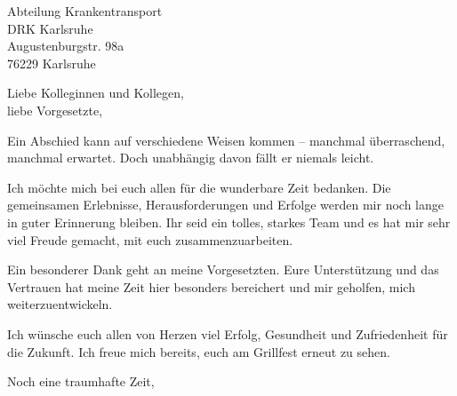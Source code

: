\documentclass[
    a4paper,
    version=last,
    ]{scrlttr2}
\begin{document}
\begin{letter}{%
	Abteilung Krankentransport \\
	DRK Karlsruhe \\
	Augustenburgstr. 98a \\
	76229 Karlsruhe \\
}



\opening{Liebe Kolleginnen und Kollegen,\\
		liebe Vorgesetzte,}

	Ein Abschied kann auf verschiedene Weisen kommen -- manchmal überraschend, manchmal erwartet. Doch unabhängig davon fällt er niemals leicht.

	Ich möchte mich bei euch allen für die wunderbare Zeit bedanken. Die gemeinsamen Erlebnisse, Herausforderungen und Erfolge werden mir noch lange in guter Erinnerung bleiben. 
	Ihr seid ein tolles, starkes Team und es hat mir sehr viel Freude gemacht, mit euch zusammenzuarbeiten.

	Ein besonderer Dank geht an meine Vorgesetzten. Eure Unterstützung und das Vertrauen hat meine Zeit hier besonders bereichert und mir geholfen, mich weiterzuentwickeln.

	Ich wünsche euch allen von Herzen viel Erfolg, Gesundheit und Zufriedenheit für die Zukunft. Ich freue mich bereits, euch am Grillfest erneut zu sehen.


\closing{Noch eine traumhafte Zeit,}


\end{letter}
\end{document}
